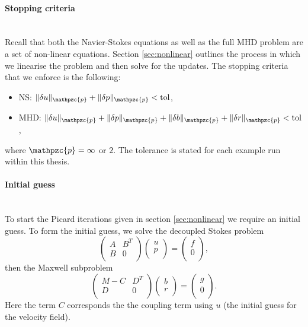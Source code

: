 \paragraph{Stopping criteria} ~\\

Recall that both the Navier-Stokes equations as well as the full MHD problem are a set of non-linear equations. Section \ref{sec:nonlinear} outlines the process in which we linearise the problem and then solve for the updates. The stopping criteria that we enforce is the following:
\begin{itemize}
  \item NS: $\|\delta {u} \|_{\mathpzc{p}}+\|\delta p \|_{\mathpzc{p}} < \mbox{tol}$,
  \item MHD: $\|\delta {u} \|_{\mathpzc{p}}+\|\delta p \|_{\mathpzc{p}}+\|\delta {b} \|_{\mathpzc{p}}+\|\delta r \|_{\mathpzc{p}} < \mbox{tol}$,
\end{itemize}
where $\mathpzc{p}=\infty$ or $2$. The tolerance is stated for each example run within this thesis.

\paragraph{Initial guess} ~\\

To start the Picard iterations given in section \ref{sec:nonlinear} we require an initial guess. To form the initial guess, we solve the decoupled Stokes problem
$$
\left(
\begin{array}{cc}
A & B^T \\
B & 0 \\
\end{array}
\right)
\left(
\begin{array}{c}
u \\
p \\
\end{array}
\right)=\left(
\begin{array}{c}
f \\
0 \\
\end{array}
\right),
$$
then the Maxwell subproblem
$$\left(
\begin{array}{cc}
M-C & D^T \\
D & 0 \\
\end{array}
\right)
\left(
\begin{array}{c}
b \\
r \\
\end{array}
\right)=\left(
\begin{array}{c}
g \\
0 \\
\end{array}
\right).$$
Here the term $C$ corresponds the the coupling term using $u$ (the initial guess for the velocity field).

